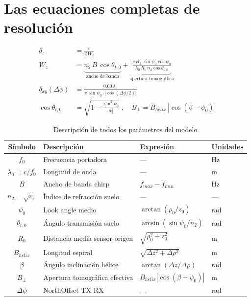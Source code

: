 \documentclass[12pt,a4paper,oneside]{book}
\newcommand{\result}[2]{%
  \begin{tcolorbox}[enhanced, breakable,
    colback=yellow!8, colframe=orange!70!black,
    fonttitle=\bfseries,
    title={\protect#1},
    attach boxed title to top left={yshift=-2mm, xshift=5mm},
    boxed title style={colback=orange!70!black}]
    #2
  \end{tcolorbox}}
\begin{document}
\section{Las ecuaciones completas de resolución}

\result{Resolución 3D — Sistema SAR Biestático Helicoidal en Dos Medios}{
\begin{align}
\boxed{\delta_z} &= \boxed{\frac{c}{2\,W_z}} \\[8pt]
W_z &= \underbrace{n_2\,B\,\cos\theta_{t,0}}_{\text{ancho de banda}} + \underbrace{\frac{c\,B_\perp\,\sin\psi_0\cos\psi_0}{\lambda_0\,R_0\,n_2\cos\theta_{t,0}}}_{\text{apertura tomográfica}} \\[8pt]
\boxed{\delta_{xy}(\Delta\phi)} &= \boxed{\frac{0.60\,\lambda_0}{\pi\,\sin\psi_0\cdot|\cos(\Delta\phi/2)|}} \\[8pt]
\cos\theta_{t,0} &= \sqrt{1-\frac{\sin^2\psi_0}{n_2^2}}\;,\quad B_\perp = B_{helix}\,|\cos(\beta-\psi_0)|
\end{align}
}

\begin{table}[H]
\centering
\caption{Descripción de todos los parámetros del modelo}
\label{tab:params}
\begin{tabular}{clll}
\toprule
Símbolo & Descripción & Expresión & Unidades \\
\midrule
$f_0$ & Frecuencia portadora & — & Hz \\
$\lambda_0 = c/f_0$ & Longitud de onda & — & m \\
$B$ & Ancho de banda chirp & $f_{max}-f_{min}$ & Hz \\
$n_2 = \sqrt{\varepsilon_r}$ & Índice de refracción suelo & — & — \\
$\psi_0$ & Look angle medio & $\arctan(\rho_0/z_0)$ & rad \\
$\theta_{t,0}$ & Ángulo transmisión suelo & $\arcsin(\sin\psi_0/n_2)$ & rad \\
$R_0$ & Distancia media sensor-origen & $\sqrt{\rho_0^2+z_0^2}$ & m \\
$B_{helix}$ & Longitud espiral & $\sqrt{\Delta z^2+\Delta\rho^2}$ & m \\
$\beta$ & Ángulo inclinación hélice & $\arctan(\Delta z/\Delta\rho)$ & rad \\
$B_\perp$ & Apertura tomográfica efectiva & $B_{helix}|\cos(\beta-\psi_0)|$ & m \\
$\Delta\phi$ & NorthOffset TX-RX & — & rad \\
\bottomrule
\end{tabular}
\end{table}
\end{document}
